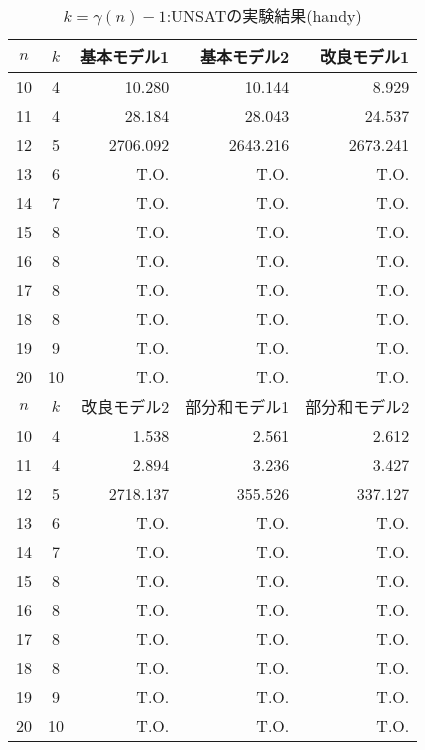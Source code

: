 \begin{table}[ht]
 \caption{$k=\gamma(n)-1$:UNSATの実験結果(handy)}
 \label{tb:exUNSAT}
 \centering
 \begin{tabular}{|c|c|r|r|r|} \hline
  $n$ & $k$ & 基本モデル1 & 基本モデル2 & 改良モデル1 \\ \hline
  10 & 4 & 10.280 & 10.144 & 8.929 \\
  11 & 4 & 28.184 & 28.043 & 24.537 \\
  12 & 5 & 2706.092 & 2643.216 & 2673.241 \\
  13 & 6 & T.O. & T.O. & T.O. \\  
  14 & 7 & T.O. & T.O. & T.O. \\ 
  15 & 8 & T.O. & T.O. & T.O. \\  
  16 & 8 & T.O. & T.O. & T.O. \\  
  17 & 8 & T.O. & T.O. & T.O. \\  
  18 & 8 & T.O. & T.O. & T.O. \\  
  19 & 9 & T.O. & T.O. & T.O. \\  
  20 & 10 & T.O. & T.O. & T.O. \\ \hline \hline
  $n$ & $k$ & 改良モデル2 & 部分和モデル1 & 部分和モデル2 \\ \hline
  10 & 4 & 1.538 & 2.561 & 2.612 \\
  11 & 4 & 2.894 & 3.236 & 3.427 \\
  12 & 5 & 2718.137 & 355.526 & 337.127 \\
  13 & 6 & T.O. & T.O. & T.O. \\  
  14 & 7 & T.O. & T.O. & T.O. \\ 
  15 & 8 & T.O. & T.O. & T.O. \\  
  16 & 8 & T.O. & T.O. & T.O. \\  
  17 & 8 & T.O. & T.O. & T.O. \\  
  18 & 8 & T.O. & T.O. & T.O. \\  
  19 & 9 & T.O. & T.O. & T.O. \\  
  20 & 10 & T.O. & T.O. & T.O. \\ \hline
 \end{tabular}
\end{table}
